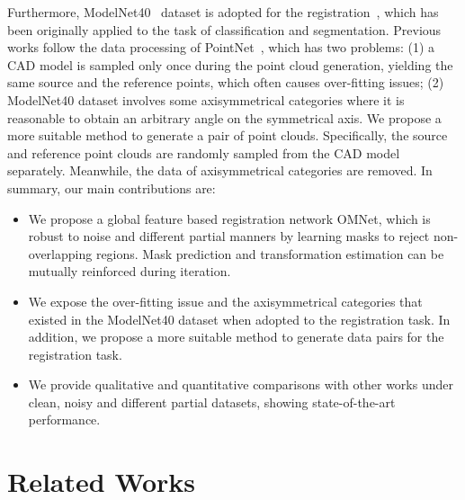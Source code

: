 \documentclass[10pt,twocolumn,letterpaper]{article}
\begin{document}
Furthermore, ModelNet40~\cite{wu20153d} dataset is adopted for the registration~\cite{wang2019deep,aoki2019pointnetlk, wang2019prnet, sarode2019pcrnet, yew2020-RPMNet, huang2020feature, idam, yuan2020deepgmr}, which has been originally applied to the task of classification and segmentation. Previous works follow the data processing of PointNet~\cite{qi2017pointnet}, which has two problems: (1) a CAD model is sampled only once during the point cloud generation, yielding the same source and the reference points, which often causes over-fitting issues; (2) ModelNet40 dataset involves some axisymmetrical categories where it is reasonable to obtain an arbitrary angle on the symmetrical axis. We propose a more suitable method to generate a pair of point clouds. Specifically, the source and reference point clouds are randomly sampled from the CAD model separately. Meanwhile, the data of axisymmetrical categories are removed. In summary, our main contributions are:

\begin{itemize}
\setlength{\itemsep}{0pt}
\setlength{\parsep}{0pt}
\setlength{\parskip}{0pt}
\item We propose a global feature based registration network OMNet, which is robust to noise and different partial manners by learning masks to reject non-overlapping regions. Mask prediction and transformation estimation can be mutually reinforced  during iteration.
\item We expose the over-fitting issue and the axisymmetrical categories that existed in the ModelNet40 dataset when adopted to the registration task. In addition, we propose a more suitable method to generate data pairs for the registration task.
\item We provide qualitative and quantitative comparisons with other works under clean, noisy and different partial datasets, showing state-of-the-art performance.
\end{itemize} 
\section{Related Works}
\end{document}
